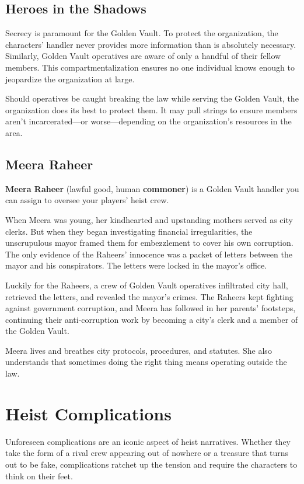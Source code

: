 \documentclass[10pt,a4paper,twoside,bg=print,twocolumn,openany,nodeprecatedcode]{dndbook}
\begin{document}
\subsection{Heroes in the Shadows}
Secrecy is paramount for the Golden Vault. To protect the organization, the characters' handler never provides more information than is absolutely necessary. Similarly, Golden Vault operatives are aware of only a handful of their fellow members. This compartmentalization ensures no one individual knows enough to jeopardize the organization at large.

Should operatives be caught breaking the law while serving the Golden Vault, the organization does its best to protect them. It may pull strings to ensure members aren't incarcerated—or worse—depending on the organization's resources in the area.

\subsection{Meera Raheer}
\textbf{Meera Raheer} (lawful good, human \textbf{commoner}) is a Golden Vault handler you can assign to oversee your players' heist crew.

When Meera was young, her kindhearted and upstanding mothers served as city clerks. But when they began investigating financial irregularities, the unscrupulous mayor framed them for embezzlement to cover his own corruption. The only evidence of the Raheers' innocence was a packet of letters between the mayor and his conspirators. The letters were locked in the mayor's office.

Luckily for the Raheers, a crew of Golden Vault operatives infiltrated city hall, retrieved the letters, and revealed the mayor's crimes. The Raheers kept fighting against government corruption, and Meera has followed in her parents' footsteps, continuing their anti-corruption work by becoming a city's clerk and a member of the Golden Vault.

Meera lives and breathes city protocols, procedures, and statutes. She also understands that sometimes doing the right thing means operating outside the law.

\section{Heist Complications}
Unforeseen complications are an iconic aspect of heist narratives. Whether they take the form of a rival crew appearing out of nowhere or a treasure that turns out to be fake, complications ratchet up the tension and require the characters to think on their feet.
\end{document}
